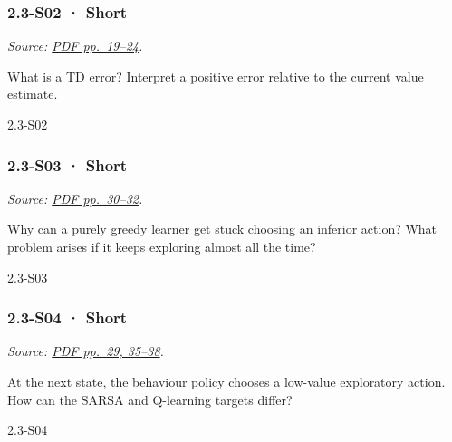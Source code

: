 \noindent\begin{minipage}{\linewidth}

\subsubsection{2.3-S02 · Short}\label{s02-short-5}

\emph{Source:
\href{../Lecture\%20Slides/2.3.\%20Q-learning.pdf\#page=19}{PDF
pp.~19--24}.}

What is a TD error? Interpret a positive error relative to the current
value estimate.

\begin{solution}[20mm]{2.3-S02}

\end{solution}
\end{minipage}\par\medskip

\noindent\begin{minipage}{\linewidth}

\subsubsection{2.3-S03 · Short}\label{s03-short-5}

\emph{Source:
\href{../Lecture\%20Slides/2.3.\%20Q-learning.pdf\#page=30}{PDF
pp.~30--32}.}

Why can a purely greedy learner get stuck choosing an inferior action?
What problem arises if it keeps exploring almost all the time?

\begin{solution}[20mm]{2.3-S03}

\end{solution}
\end{minipage}\par\medskip

\noindent\begin{minipage}{\linewidth}

\subsubsection{2.3-S04 · Short}\label{s04-short-5}

\emph{Source:
\href{../Lecture\%20Slides/2.3.\%20Q-learning.pdf\#page=29}{PDF pp.~29,
35--38}.}

At the next state, the behaviour policy chooses a low-value exploratory
action. How can the SARSA and Q-learning targets differ?

\begin{solution}[20mm]{2.3-S04}

\end{solution}
\end{minipage}\par\medskip


